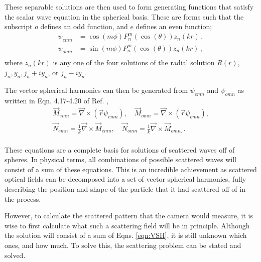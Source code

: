 These separable solutions are then used to form generating functions that satisfy the scalar wave equation in the spherical basis. These are forms such that the subscript $o$ defines an odd function, and $e$ defines an even function;
\begin{equation}
    \begin{aligned}
            \psi_{emn} &= \cos(m\phi) P^m_n(\cos(\theta))z_n(kr)\,, \\
            \psi_{omn} &= \sin(m\phi) P^m_n(\cos(\theta))z_n(kr)\,, \\
    \end{aligned}
\end{equation}
where $z_n(kr)$ is any one of the four solutions of the radial solution $R(r)$, $j_n, y_n, j_n + iy_n$, or $j_n - iy_n$.

The vector spherical harmonics can then be generated from $\psi_{emn}$ and $\psi_{omn}$ as written in Eqn. 4.17-4.20 of Ref. \cite{bohren1983absorption},
\begin{equation}\label{eqn:VSH}
    \begin{aligned}
        \vec{M}_{emn} = \vec \nabla \times (\vec r \psi_{emn}), \quad \vec{M}_{omn} = \vec \nabla \times (\vec r \psi_{omn}), \\
        \vec{N}_{emn} = \frac{1}{k}\vec \nabla \times \vec{M}_{emn}, \quad \vec{N}_{omn} = \frac{1}{k}\vec \nabla \times \vec{M}_{omn.}\,. \\
    \end{aligned}
\end{equation}

These equations are a complete basis for solutions of scattered waves off of spheres. In physical terms, all combinations of possible scattered waves will consist of a sum of these equations. This is an incredible achievement as scattered optical fields can be decomposed into a set of vector spherical harmonics, fully describing the position and shape of the particle that it had scattered off of in the process.

However, to calculate the scattered pattern that the camera would measure, it is wise to first calculate what such a scattering field will be in principle. Although the solution will consist of a sum of Eqns. \ref{eqn:VSH}, it is still unknown which ones, and how much. To solve this, the scattering problem can be stated and solved.

